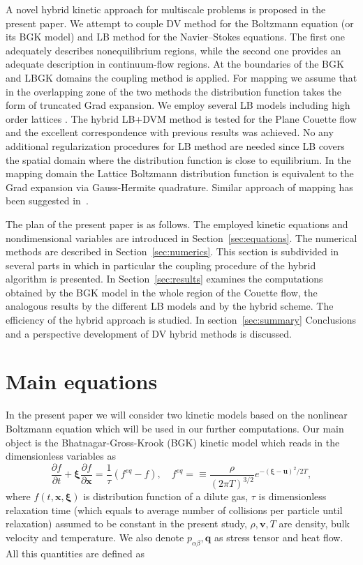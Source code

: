 \documentclass[]{elsarticle} %
\begin{document}
{A novel hybrid kinetic approach for multiscale problems is proposed in the present paper. We attempt to couple DV method for the Boltzmann equation (or its BGK model) and LB method for the Navier--Stokes equations. The first one adequately describes nonequilibrium regions, while the second one provides an adequate description in continuum-flow regions. At the boundaries of the BGK and LBGK domains the coupling method is applied. For mapping we assume that in the overlapping zone of the two methods the distribution function takes the form of truncated Grad expansion.  We employ several LB models including  high order lattices \cite{Shan2006,Feuchter2016}. The hybrid LB+DVM method is tested for the Plane Couette flow and the excellent correspondence with previous results was achieved. No any  additional  regularization procedures \cite{Latt2006, Mont2015} for LB method are needed since LB covers the spatial domain where the distribution function is close to equilibrium.
In the mapping domain the Lattice Boltzmann distribution function is equivalent to the Grad expansion via Gauss-Hermite quadrature. Similar approach of mapping has been suggested in~\cite{Staso2016short, Staso2016long, Staso2018}.

The plan of the present paper is as follows. The employed kinetic equations and nondimensional variables are introduced in Section~\ref{sec:equations}. The numerical methods are described in Section~\ref{sec:numerics}. This section is subdivided in several parts in which in particular the coupling procedure of the hybrid algorithm is presented. In Section~\ref{sec:results} examines the computations obtained by the BGK model in the whole region of the Couette flow, the analogous results by the different LB models and by the hybrid scheme. The efficiency of the hybrid approach is studied. In section~\ref{sec:summary} Conclusions and a perspective development of DV hybrid methods is discussed.

\section{Main equations}

In the present  paper we will consider  two  kinetic models based on the  nonlinear  Boltzmann equation which will be used in our further computations.
Our main object is the Bhatnagar-Gross-Krook (BGK) kinetic model \cite{Kogan1969} which reads  in the  dimensionless variables as
\begin{equation}\label{bgk}
\frac{\partial f}{\partial t}+\boldsymbol{\xi}\frac{\partial f}{\partial \mathbf{x}}=\frac{{1}}{\tau}(f^{eq}-f), \quad f^{eq}=\equiv\frac{\rho}{(2\pi T)^{3/2}}e^{-(\boldsymbol{\xi}-\mathbf{u})^2/2T},
\end{equation}
where  $f(t,\mathbf{x},\boldsymbol{\xi})$  is   distribution function of  a dilute  gas, $\tau$  is dimensionless  relaxation time (which equals  to average number of collisions per particle until relaxation) assumed  to be  constant  in the present study, $\rho,\mathbf{v},T$ are  density, bulk velocity and  temperature. We also denote  $p_{\alpha \beta}, \mathbf{q}$ as stress tensor and  heat flow.
All this quantities are defined as

}
\end{document}
